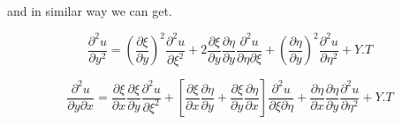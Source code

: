 \documentclass[]{article}
\begin{document}
and in similar way we can get.

\begin{equation}
\frac{\partial^2 u}{\partial y^2} = {(\frac{\partial\xi}{\partial y})}^2\frac{\partial^2 u}{\partial\xi^2}+2\frac{\partial\xi}{\partial y}\frac{\partial\eta}{\partial y}\frac{\partial^2 u}{\partial\eta\partial\xi}+{(\frac{\partial\eta}{\partial y})}^2\frac{\partial^2 u}{\partial\eta^2}+Y.T
\end{equation}

\begin{equation}
\frac{\partial^2 u}{\partial y\partial x} = \frac{\partial\xi}{\partial x}\frac{\partial\xi}{\partial y}\frac{\partial^2 u}{\partial\xi^2}+\left[\frac{\partial\xi}{\partial x}\frac{\partial\eta}{\partial y}+\frac{\partial\xi}{\partial y}\frac{\partial\eta}{\partial x}\right]\frac{\partial^2 u}{\partial\xi\partial\eta}+\frac{\partial\eta}{\partial x}\frac{\partial\eta}{\partial y}\frac{\partial^2 u}{\partial\eta^2} + Y.T
\end{equation}
\end{document}
